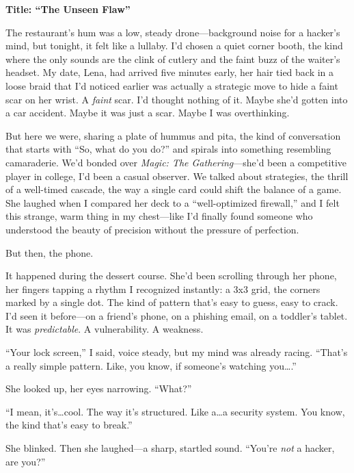 \documentclass{article}
\theoremstyle{plain}
\theoremstyle{definition}
\theoremstyle{remark}
\begin{document}
\begin{tcolorbox}[colback=green!3, colframe=green!40!black, title=\textbf{RcRL (Ours)}, fonttitle=\bfseries, left=2mm, right=2mm, breakable]
\small
\textbf{Title: ``The Unseen Flaw''}

The restaurant’s hum was a low, steady drone—background noise for a hacker’s mind, but tonight, it felt like a lullaby. I’d chosen a quiet corner booth, the kind where the only sounds are the clink of cutlery and the faint buzz of the waiter’s headset. My date, Lena, had arrived five minutes early, her hair tied back in a loose braid that I’d noticed earlier was actually a strategic move to hide a faint scar on her wrist. A \textit{faint} scar. I’d thought nothing of it. Maybe she’d gotten into a car accident. Maybe it was just a scar. Maybe I was overthinking.

But here we were, sharing a plate of hummus and pita, the kind of conversation that starts with ``So, what do you do?'' and spirals into something resembling camaraderie. We’d bonded over \textit{Magic: The Gathering}—she’d been a competitive player in college, I’d been a casual observer. We talked about strategies, the thrill of a well-timed cascade, the way a single card could shift the balance of a game. She laughed when I compared her deck to a ``well-optimized firewall,'' and I felt this strange, warm thing in my chest—like I’d finally found someone who understood the beauty of precision without the pressure of perfection.

But then, the phone.

It happened during the dessert course. She’d been scrolling through her phone, her fingers tapping a rhythm I recognized instantly: a 3x3 grid, the corners marked by a single dot. The kind of pattern that’s easy to guess, easy to crack. I’d seen it before—on a friend’s phone, on a phishing email, on a toddler’s tablet. It was \textit{predictable}. A vulnerability. A weakness.

``Your lock screen,'' I said, voice steady, but my mind was already racing. ``That’s a really simple pattern. Like, you know, if someone’s watching you\dots.''

She looked up, her eyes narrowing. ``What?''

``I mean, it’s\dots cool. The way it’s structured. Like a\dots a security system. You know, the kind that’s easy to break.''

She blinked. Then she laughed—a sharp, startled sound. ``You’re \textit{not} a hacker, are you?''


\end{tcolorbox}
\end{document}
